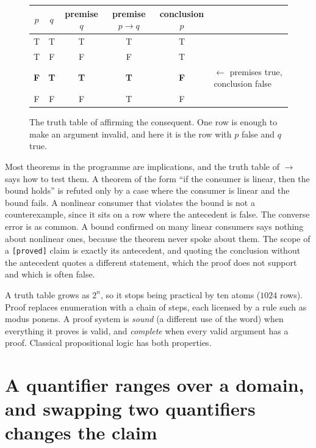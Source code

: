 \begin{figure}[tbp]
\centering
\begin{tabular}{cc|cc|cl}
$p$ & $q$ & premise $q$ & premise $p\to q$ & conclusion $p$ & \\
\midrule
T & T & T & T & T & \\
T & F & F & F & T & \\
\textcolor{pred}{\textbf{F}} & \textcolor{pred}{\textbf{T}} & \textcolor{pred}{\textbf{T}} & \textcolor{pred}{\textbf{T}} & \textcolor{pred}{\textbf{F}} & \textcolor{pred}{\small $\leftarrow$ premises true, conclusion false}\\
F & F & F & T & F & \\
\end{tabular}
\caption{The truth table of affirming the consequent. One row is enough to make an argument invalid, and here it is the row with $p$ false and $q$ true.}
\label{fig:ch10:truth}
\end{figure}

Most theorems in the programme are implications, and the truth table of $\to$ says how to test them. A theorem of the form ``if the consumer is linear, then the bound holds'' is refuted only by a case where the consumer is linear and the bound fails. A nonlinear consumer that violates the bound is not a counterexample, since it sits on a row where the antecedent is false. The converse error is as common. A bound confirmed on many linear consumers says nothing about nonlinear ones, because the theorem never spoke about them. The scope of a \texttt{[proved]} claim is exactly its antecedent, and quoting the conclusion without the antecedent quotes a different statement, which the proof does not support and which is often false.

A truth table grows as $2^n$, so it stops being practical by ten atoms ($1024$ rows). Proof replaces enumeration with a chain of steps, each licensed by a rule such as modus ponens. A proof system is \emph{sound} (a different use of the word) when everything it proves is valid, and \emph{complete} when every valid argument has a proof. Classical propositional logic has both properties.


\section{A quantifier ranges over a domain, and swapping two quantifiers changes the claim}\label{sec:ch10:quant}

